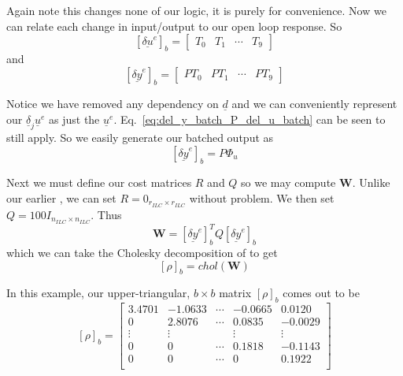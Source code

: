 Again note this changes none of our logic, it is purely for convenience. Now we can relate each change in input/output to our open loop response. So 
\begin{equation}
    {\left[\underline{\delta u}^e\right]}_b =
    \begin{bmatrix}
        T_0 & T_1 & \cdots & T_9
    \end{bmatrix}
\end{equation}
and
\begin{equation}
    {\left[\underline{\delta y}^e\right]}_b  = 
    \begin{bmatrix}
        PT_0 & PT_1 & \cdots & PT_9
    \end{bmatrix}
\end{equation}

Notice we have removed any dependency on $\underline{d}$ and we can conveniently represent our $\underline{\delta}_j\underline{u}^e$ as just the $\underline{u}^e$. Eq.~\ref{eq:del_y_batch_P_del_u_batch} can be seen to still apply. So we easily generate our batched output as
\begin{equation}
    {\left[\underline{\delta y}^e\right]}_b  = P\Phi_u
\end{equation}

Next we must define our cost matrices $R$ and $Q$ so we may compute \textbf{W}. Unlike our earlier , we can set $R = 0_{r_{ILC} \times r_{ILC}}$ without problem. We then set $Q = 100I_{n_{ILC} \times n_{ILC}}$. Thus
\begin{equation}
    \textbf{W} = {\left[\underline{\delta y}^e\right]}_b^T Q {\left[\underline{\delta y}^e\right]}_b
\end{equation}
which we can take the Cholesky decomposition of to get
\begin{equation}
    {\left[\rho\right]}_b = chol(\textbf{W})
\end{equation}

In this example, our upper-triangular, $b \times b$ matrix ${\left[\rho\right]}_b$ comes out to be
\begin{equation}
    {\left[\rho\right]}_b = 
    \begin{bmatrix}
        3.4701 &  -1.0633 & \cdots & -0.0665  &  0.0120 \\
        0  &  2.8076 & \cdots & 0.0835 &  -0.0029 \\
        \vdots & \vdots &  & \vdots & \vdots \\
        0 &  0 & \cdots & 0.1818 &  -0.1143 \\
        0  &  0 & \cdots & 0 &  0.1922 \\
    \end{bmatrix}
\end{equation}

